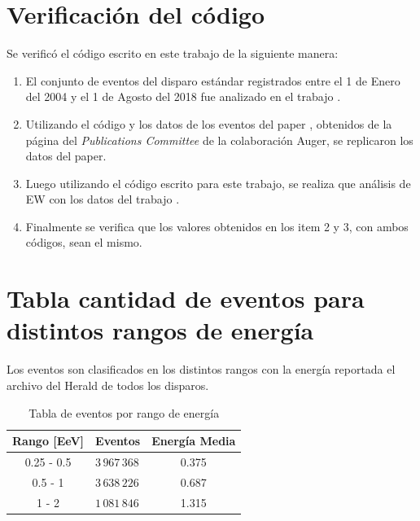 \section*{Verificación del código}
Se verificó el código escrito en este trabajo de la siguiente manera:

\begin{enumerate}
    \item El conjunto de eventos del disparo estándar registrados entre el 1 de Enero del 2004 y el 1 de Agosto del 2018 fue analizado en el trabajo \cite{Aab_2020}.
    \item Utilizando el código y los datos de los eventos del paper \cite{Aab_2020}, obtenidos de la página del \emph{Publications Committee} de la colaboración Auger, se replicaron los datos del paper. 
    \item Luego utilizando el código escrito para este trabajo, se realiza que análisis de EW con los datos del trabajo \cite{Aab_2020}. 
    \item Finalmente se verifica que los valores obtenidos en los item 2 y 3, con  ambos códigos, sean el mismo.
\end{enumerate}


\section*{Tabla cantidad de eventos para distintos rangos de energía}

Los eventos son clasificados en los distintos rangos con la energía reportada el archivo del Herald de todos los disparos.
\begin{table}[H]
    \begin{small}
        \begin{center}
            \begin{tabular}[c]{c|l|c}
                \multicolumn{1}{c|}{\textbf{Rango [EeV]}} & 
                \multicolumn{1}{c|}{\textbf{Eventos}} 
                & \bf{Energía Media} \\
                \hline
                0.25 - 0.5  & $3\,967\,368$ & 0.375\\
                0.5  - 1    & $3\,638\,226$ & 0.687\\
                1    - 2    & $1\,081\,846$ & 1.315 \\
            \end{tabular}
            \caption{Tabla de eventos por rango de energía }
            \label{tab:}
        \end{center}
    \end{small}
\end{table}


